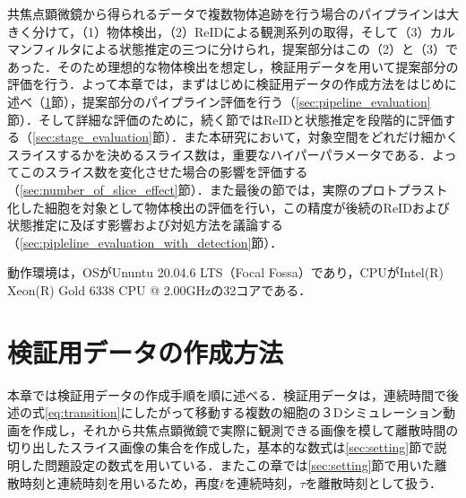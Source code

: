 \thispagestyle{fancy2}

共焦点顕微鏡から得られるデータで複数物体追跡を行う場合のパイプラインは大きく分けて，（1）物体検出，（2）ReIDによる観測系列の取得，そして（3）カルマンフィルタによる状態推定の三つに分けられ，提案部分はこの（2）と（3）であった．そのため理想的な物体検出を想定し，検証用データを用いて提案部分の評価を行う．よって本章では，まずはじめに検証用データの作成方法をはじめに述べ（\ref{sec:demodata}節），提案部分のパイプライン評価を行う（\ref{sec:pipeline_evaluation}節）．そして詳細な評価のために，続く節ではReIDと状態推定を段階的に評価する（\ref{sec:stage_evaluation}節）．また本研究において，対象空間をどれだけ細かくスライスするかを決めるスライス数は，重要なハイパーパラメータである．よってこのスライス数を変化させた場合の影響を評価する（\ref{sec:number_of_slice_effect}節）．また最後の節では，実際のプロトプラスト化した細胞を対象として物体検出の評価を行い，この精度が後続のReIDおよび状態推定に及ぼす影響および対処方法を議論する（\ref{sec:pipleline_evaluation_with_detection}節）．

動作環境は，OSがUnuntu 20.04.6 LTS（Focal Fossa）であり，CPUがIntel(R) Xeon(R) Gold 6338 CPU @ 2.00GHzの32コアである．

\section{検証用データの作成方法}
\label{sec:demodata}

本章では検証用データの作成手順を順に述べる．検証用データは，連続時間で後述の式\ref{eq:transition}にしたがって移動する複数の細胞の３Dシミュレーション動画を作成し，それから共焦点顕微鏡で実際に観測できる画像を模して離散時間の切り出したスライス画像の集合を作成した，基本的な数式は\ref{sec:setting}節で説明した問題設定の数式を用いている．またこの章では\ref{sec:setting}節で用いた離散時刻と連続時刻を用いるため，再度$t$を連続時刻，$\tau$を離散時刻として扱う．

